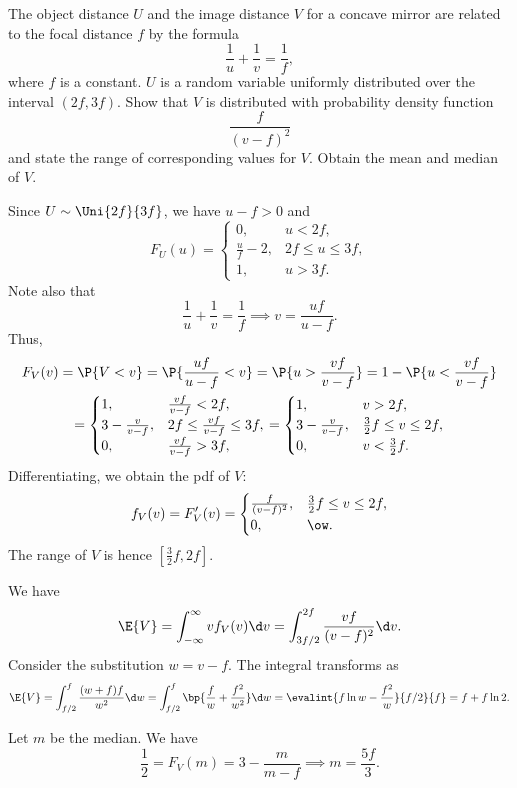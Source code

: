 \begin{problem}
    The object distance $U$ and the image distance $V$ for a concave mirror are related to the focal distance $f$ by the formula \[\frac1u + \frac1v = \frac1f,\] where $f$ is a constant. $U$ is a random variable uniformly distributed over the interval $(2f,3f)$. Show that $V$ is distributed with probability density function \[\frac{f}{(v-f)^2}\] and state the range of corresponding values for $V$. Obtain the mean and median of $V$.
\end{problem}
\begin{solution}
    Since $U \sim \Uni{2f}{3f}$, we have $u-f>0$ and \[F_U(u) = \begin{cases}
        0, & u < 2f,\\
        \frac{u}{f} - 2, & 2f \leq u \leq 3f,\\
        1, & u > 3f.
    \end{cases}\] Note also that \[\frac1u + \frac1v = \frac1f \implies v = \frac{uf}{u-f}.\] Thus,
    \begin{gather*}
        F_V(v) = \P{V < v} = \P{\frac{uf}{u-f} < v} = \P{u > \frac{vf}{v-f}} = 1 - \P{u < \frac{vf}{v-f}}\\
        = \begin{cases}
            1, & \frac{vf}{v-f} < 2f,\\
            3 - \frac{v}{v-f}, & 2f \leq \frac{vf}{v-f} \leq 3f,\\
            0, & \frac{vf}{v-f} > 3f,
        \end{cases} = \begin{cases}
            1, & v > 2f,\\
            3 - \frac{v}{v-f}, & \frac32 f \leq v \leq 2f,\\
            0, & v < \frac32 f.
        \end{cases}
    \end{gather*}
    Differentiating, we obtain the pdf of $V$: \[f_V(v) = F'_V(v) = \begin{cases}
        \frac{f}{(v-f)^2}, & \frac32 f \leq v \leq 2f,\\
        0, & \ow.
    \end{cases}\] The range of $V$ is hence $[\frac32f, 2f]$.

    We have \[\E{V} = \int_{-\infty}^\infty v f_V(v) \d v = \int_{3f/2}^{2f} \frac{vf}{(v-f)^2} \d v.\] Consider the substitution $w = v - f$. The integral transforms as \[\E{V} = \int_{f/2}^f \frac{(w+f)f}{w^2} \d w = \int_{f/2}^f \bp{\frac{f}{w} + \frac{f^2}{w^2}} \d w = \evalint{f \ln w - \frac{f^2}{w}}{f/2}{f} = f + f \ln 2.\]

    Let $m$ be the median. We have \[\frac12 = F_V(m) = 3 - \frac{m}{m-f} \implies m = \frac{5f}{3}.\]
\end{solution}


